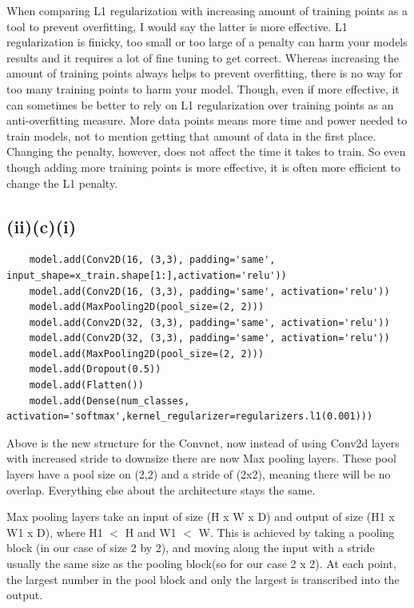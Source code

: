 \documentclass{article}
\begin{document}
When comparing L1 regularization with increasing amount of training points as a tool to prevent overfitting, I would say the latter is more effective. L1 regularization is finicky, too small or too large of a penalty can harm your models results and it requires a lot of fine tuning to get correct. Whereas increasing the amount of training points always helps to prevent overfitting, there is no way for too many training points to harm your model. Though, even if more effective, it can sometimes be better to rely on L1 regularization over training points as an anti-overfitting measure. More data points means more time and power needed to train models, not to mention getting that amount of data in the first place. Changing the penalty, however, does not affect the time it takes to train. So even though adding more training points is more effective, it is often more efficient to change the L1 penalty.

\subsection{(ii)(c)(i)}
\begin{lstlisting}
	model.add(Conv2D(16, (3,3), padding='same', input_shape=x_train.shape[1:],activation='relu'))
	model.add(Conv2D(16, (3,3), padding='same', activation='relu'))
	model.add(MaxPooling2D(pool_size=(2, 2)))
	model.add(Conv2D(32, (3,3), padding='same', activation='relu'))
	model.add(Conv2D(32, (3,3), padding='same', activation='relu'))
	model.add(MaxPooling2D(pool_size=(2, 2)))
	model.add(Dropout(0.5))
	model.add(Flatten())
	model.add(Dense(num_classes, activation='softmax',kernel_regularizer=regularizers.l1(0.001)))
\end{lstlisting}

Above is the new structure for the Convnet, now instead of using Conv2d layers with increased stride to downsize there are now Max pooling layers. These pool layers have a pool size on (2,2) and a stride of (2x2), meaning there will be no overlap. Everything else about the architecture stays the same.

Max pooling layers take an input of size (H x W x D) and output of size (H1 x W1 x D), where H1 $< $ H and W1 $<$ W. This is achieved by taking a pooling block (in our case of size 2 by 2), and moving along the input with a stride usually the same size as the pooling block(so for our case 2 x 2). At each point, the largest number in the pool block and only the largest is transcribed into the output.
\end{document}
